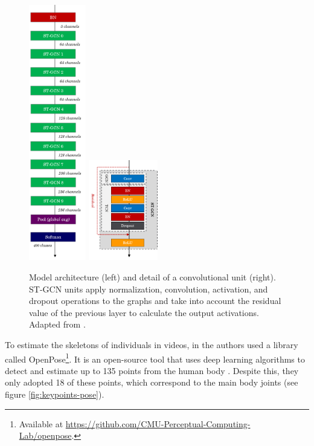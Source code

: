 \begin{figure}[ht]
    \centering
    \includegraphics[width=2.5cm]{images/st_gcn_architecture}
    \includegraphics[width=3.0cm]{images/st_gcn_architeture_unit}
    \caption{Model architecture (left) and detail of a convolutional unit (right). ST-GCN units apply normalization, convolution, activation, and dropout operations to the graphs and take into account the residual value of the previous layer to calculate the output activations. Adapted from \cite{st-gcn-2018}.}
    \label{fig:st-gcn-architecture}
\end{figure}

To estimate the skeletons of individuals in videos, in \cite{st-gcn-2018} the authors used a library called OpenPose\footnote{
    Available at \url{https://github.com/CMU-Perceptual-Computing-Lab/openpose}.
}. It is an open-source tool that uses deep learning algorithms to detect and estimate up to 135 points from the human body \cite{cao-realtime-2017, simon-hand-2017, wei-cpm-2016}. Despite this, they only adopted 18 of these points, which correspond to the main body joints (see figure \ref{fig:keypoints-pose}).


